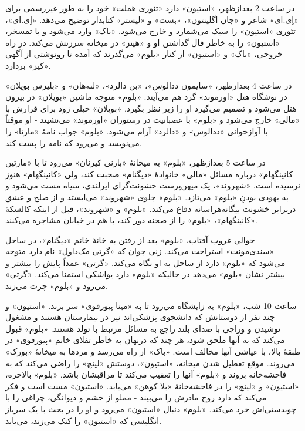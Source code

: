 \documentclass[12pt]{book}
\newcommand{\noun}[1]{«{#1}»}
\begin{document}
    در ساعت 2 بعدازظهر، \noun{استیون} دارد «تئوری هملت» خود را به طور غیررسمی برای \noun{اِی.ای} شاعر و \noun{جان اگلینتون}، \noun{بست} و \noun{لیستر} کتابدار توضیح می‌دهد. \noun{اِی.ای}، تئوری \noun{استیون} را سبک می‌شمارد و خارج می‌شود. \noun{باک} وارد می‌شود و با تمسخر، \noun{استیون} را به خاطر قال گذاشتن او و \noun{هینز} در میخانه سرزنش می‌کند. در راه خروجی، \noun{باک} و \noun{استیون} از کنار \noun{بلوم} می‌گذرند که آمده تا رونوشتی از آگهی \noun{کیز} بردارد.

    در ساعت 4 بعدازظهر، \noun{سایمون ددالوس}، \noun{بن دالرد}، \noun{لنه‌هان} و \noun{بلیزس بویلان} در نوشگاه هتل \noun{اورموند} گرد هم می‌آیند. \noun{بلوم} متوجه ماشین \noun{بویلان} در بیرون هتل می‌شود و تصمیم می‌گیرد او را زیر نظر بگیرد. \noun{بویلان} خیلی زود برای قرارش با \noun{مالی} خارج می‌شود و \noun{بلوم} با عصبانیت در رستوران \noun{اورموند} می‌نشیند - او موقتاً با آوازخوانی \noun{ددالوس} و \noun{دالرد} آرام می‌شود. \noun{بلوم} جواب نامۀ \noun{مارتا} را می‌نویسد و می‌رود که نامه را پست کند.

    در ساعت 5 بعدازظهر، \noun{بلوم} به میخانۀ \noun{بارنی کیرنان} می‌رود تا با \noun{مارتین کانینگهام} درباره مسائل \noun{مالی} خانوادۀ \noun{دیگنام} صحبت کند، ولی \noun{کانینگهام} هنوز نرسیده است. \noun{شهروند}، یک میهن‌پرست خشونت‌گرای ایرلندی، سیاه مست می‌شود و به یهودی بودنِ \noun{بلوم} می‌تازد. \noun{بلوم} جلوی \noun{شهروند} می‌ایستد و از صلح و عشق دربرابر خشونت بیگانه‌هراسانه دفاع می‌کند. \noun{بلوم} و \noun{شهروند}، قبل از اینکه کالسکۀ \noun{کانینگهام}، \noun{بلوم} را از صحنه دور کند، با هم در خیابان مشاجره می‌کنند.

    حوالی غروب آفتاب، \noun{بلوم} بعد از رفتن به خانۀ خانم \noun{دیگنام}، در ساحل \noun{سندی‌مونت} استراحت می‌کند. زنی جوان که \noun{گرتی مک‌داول} نام دارد متوجه می‌شود که \noun{بلوم} دارد از ساحل به او نگاه می‌کند. \noun{گرتی} عمداً پایش را بیشتر و بیشتر نشان \noun{بلوم} می‌دهد در حالیکه \noun{بلوم} دارد یواشکی استمنا می‌کند. \noun{گرتی} می‌رود و \noun{بلوم} چرت می‌زند.

    ساعت 10 شب، \noun{بلوم} به زایشگاه می‌رود تا به \noun{مینا پیورفوی} سر بزند. \noun{استیون} و چند نفر از دوستانش که دانشجوی پزشکی‌اند نیز در بیمارستان هستند و مشغول نوشیدن و وراجی با صدای بلند راجع به مسائل مرتبط با تولد هستند. \noun{بلوم} قبول می‌کند که به آنها ملحق شود، هر چند که درنهان به خاطر تقلای خانم \noun{پیورفوی} در طبقۀ بالا، با عیاشی آنها مخالف است. \noun{باک} از راه می‌رسد و مردها به میخانۀ \noun{بورک} می‌روند. موقع تعطیل شدن میخانه، \noun{استیون}، دوستش \noun{لینچ} را راضی می‌کند که به فاحشه‌خانه بروند و \noun{بلوم} آنها را تعقیب می‌کند تا مراقبشان باشد.
    \noun{بلوم} بالاخره، \noun{استیون} و \noun{لینچ} را در فاحشه‌خانۀ \noun{بلا کوهن} می‌یابد. \noun{استیون} مست است و فکر می‌کند که دارد روح مادرش را می‌بیند - مملو از خشم و دیوانگی، چراغی را با چوبدستی‌اش خرد می‌کند. \noun{بلوم} دنبال \noun{استیون} می‌رود و او را در بحث با یک سرباز انگلیسی که \noun{استیون} را کتک می‌زند، می‌یابد.
\end{document}
